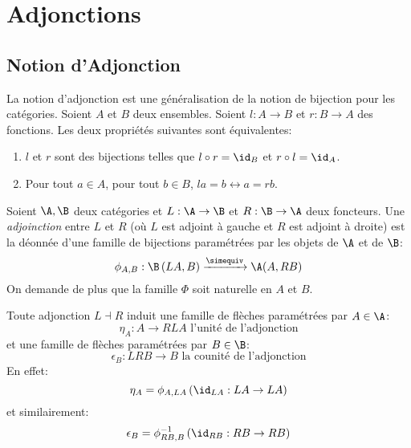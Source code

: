 \documentclass[math, info]{cours}
\begin{document}
\section{Adjonctions}
\subsection{Notion d'Adjonction}
La notion d'adjonction est une généralisation de la notion de bijection pour les catégories.
Soient $A$ et $B$ deux ensembles. Soient $l : A \to B$ et $r: B \to A$ des fonctions.
Les deux propriétés suivantes sont équivalentes:
\begin{enumerate}
	\item $l$ et $r$ sont des bijections telles que $l \circ r = \id_{B}$ et $r \circ l = \id_{A}$.
	\item Pour tout $a \in A$, pour tout $b \in B$, $la = b \leftrightarrow a = rb$.
\end{enumerate}

\begin{definition}
	Soient $\A, \B$ deux catégories et $L : \A \to \B$ et $R: \B \to \A$ deux foncteurs.
	Une \emph{adjoinction} entre $L$ et $R$ (où $L$ est adjoint à gauche et $R$ est adjoint à droite) est la déonnée d'une famille de bijections paramétrées par les objets de $\A$ et de $\B$:
	\begin{equation*}
		\phi_{A, B} : \B\left(LA, B \right)\xrightarrow{\simequiv} \A(A, RB)
	\end{equation*}
	On demande de plus que la famille $\Phi$ soit naturelle en $A$ et $B$.
	\label{def:adjonction}
\end{definition}

\begin{definition}
	Toute adjonction $L \dashv R$ induit une famille de flèches paramétrées par $A \in \A$:
	\begin{equation*}
		\eta_{A}: A \to RLA \text{ l'unité de l'adjonction}
	\end{equation*}
	et une famille de flèches paramétrées par $B \in \B$:
	\begin{equation*}
		\epsilon_{B} : LRB \to B \text{ la counité de l'adjonction}
	\end{equation*}
	En effet:
	\begin{equation*}
		\eta_{A} = \phi_{A, LA}\left(\id_{LA} : LA \to LA \right)
	\end{equation*}
	et similairement:
	\begin{equation*}
		\epsilon_{B} = \phi_{RB, B}^{-1}\left(\id_{RB}: RB \to RB \right)
	\end{equation*}
	\label{def:unitécounité}
\end{definition}
\end{document}
